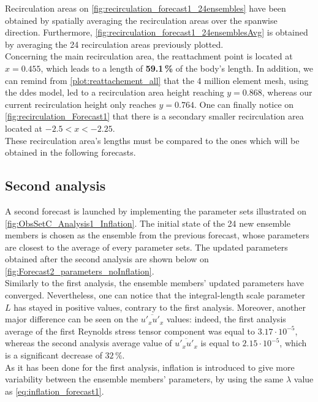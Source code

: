 \documentclass[12pt,twoside]{report}
\begin{document}
Recirculation areas on \autoref{fig:recirculation_forecast1_24ensembles} have been obtained by spatially averaging the recirculation areas over the spanwise direction. Furthermore, \autoref{fig:recirculation_forecast1_24ensemblesAvg} is obtained by averaging the 24 recirculation areas previously plotted. \\
Concerning the main recirculation area, the reattachment point is located at $x=0.455$, which leads to a length of \textbf{59.1\,\%} of the body's length. In addition, we can remind from \autoref{plot:reattachement_all} that the 4 million element mesh, using the \gls{ddes} model, led to a recirculation area height reaching $y=0.868$, whereas our current recirculation height only reaches $y=0.764$. One can finally notice on \autoref{fig:recirculation_Forecast1} that there is a secondary smaller recirculation area located at $-2.5<x<-2.25$. \\

These recirculation area's lengths must be compared to the ones which will be obtained in the following forecasts. 

\subsection{Second analysis}

A second forecast is launched by implementing the parameter sets illustrated on \autoref{fig:ObsSetC_Analysis1_Inflation}. The initial state of the 24 new ensemble members is chosen as the ensemble from the previous forecast, whose parameters are closest to the average of every parameter sets. The updated parameters obtained after the second analysis are shown below on \autoref{fig:Forecast2_parameters_noInflation}. \\

Similarly to the first analysis, the ensemble members' updated parameters have converged. Nevertheless, one can notice that the integral-length scale parameter $L$ has stayed in positive values, contrary to the first analysis. Moreover, another major difference can be seen on the $\overline{u'_x u'_x}$ values: indeed, the first analysis average of the first Reynolds stress tensor component was equal to $3.17\cdot 10^{-5}$, whereas the second analysis average value of $\overline{u'_x u'_x}$ is equal to $2.15 \cdot 10^{-5}$, which is a significant decrease of $32\,\%$. \\

As it has been done for the first analysis, inflation is introduced to give more variability between the ensemble members' parameters, by using the same $\lambda$ value as \autoref{eq:inflation_forecast1}. 
\end{document}
